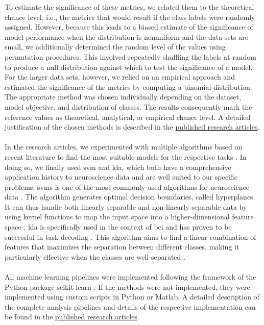 \noindent To estimate the significance of these metrics, we related them to the theoretical chance level, i.e., the metrics that would result if the class labels were randomly assigned. However, because this leads to a biased estimate of the significance of model performance when the distribution is nonuniform and the data sets are small, we additionally determined the random level of the values using permutation procedures. This involved repeatedly shuffling the labels at random to produce a null distribution against which to test the significance of a model. For the larger data sets, however, we relied on an empirical approach and estimated the significance of the metrics by computing a binomial distribution. The appropriate method was chosen individually depending on the dataset, model objective, and distribution of classes. The results consequently mark the reference values as theoretical, analytical, or empirical chance level. A detailed justification of the chosen methods is described in the \hyperref[pub:papers]{published research articles}.\\
\\
In the research articles, we experimented with multiple algorithms based on recent literature to find the most suitable models for the respective tasks \cite{Shoorangiz2023}. In doing so, we finally used \gls{svm} and \gls{lda}, which both have a comprehensive application history to neuroscience data and are well suited to our specific problems.  \Glspl{svm} is one of the most commonly used algorithms for neuroscience data \cite{Varoquaux2017}. The algorithm generates optimal decision boundaries, called hyperplanes. It can thus handle both linearly separable and non-linearly separable data by using kernel functions to map the input space into a higher-dimensional feature space \cite{Shoorangiz2023}. \Gls{lda} is specifically used in the context of \Gls{bci} and has proven to be successful in task decoding \cite{Blankertz2008}. This algorithm aims to find a linear combination of features that maximizes the separation between different classes, making it particularly effective when the classes are well-separated \cite{Shoorangiz2023}.\\
\\
All machine learning pipelines were implemented following the framework of the Python package scikit-learn \cite{Pedregosa2011}. If the methods were not implemented, they were implemented using custom scripts in Python or Matlab. A detailed description of the complete analysis pipelines and details of the respective implementation can be found in the \hyperref[pub:papers]{published research articles}. 
